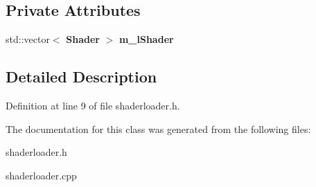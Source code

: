 \subsection*{Private Attributes}
\begin{DoxyCompactItemize}
\item 
std\-::vector$<$ {\bf Shader} $>$ {\bfseries m\-\_\-l\-Shader}\label{classSoundFieldViewer_1_1ShaderLoader_ad755652c68508c858d8d4972dbadbaa3}

\end{DoxyCompactItemize}


\subsection{Detailed Description}


Definition at line 9 of file shaderloader.\-h.



The documentation for this class was generated from the following files\-:\begin{DoxyCompactItemize}
\item 
shaderloader.\-h\item 
shaderloader.\-cpp\end{DoxyCompactItemize}
